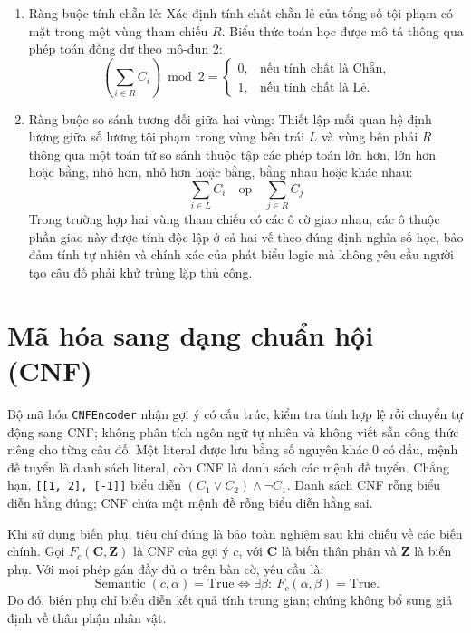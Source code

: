 \begin{enumerate}
    \item Ràng buộc tính chẵn lẻ: Xác định tính chất chẵn lẻ của tổng số tội phạm có mặt trong một vùng tham chiếu $R$. Biểu thức toán học được mô tả thông qua phép toán đồng dư theo mô-đun 2:
    \[
    \left(\sum_{i \in R} C_i\right) \bmod 2 = 
    \begin{cases}
    0, & \text{nếu tính chất là Chẵn}, \\
    1, & \text{nếu tính chất là Lẻ}.
    \end{cases}
    \]
    \item Ràng buộc so sánh tương đối giữa hai vùng: Thiết lập mối quan hệ định lượng giữa số lượng tội phạm trong vùng bên trái $L$ và vùng bên phải $R$ thông qua một toán tử so sánh thuộc tập các phép toán lớn hơn, lớn hơn hoặc bằng, nhỏ hơn, nhỏ hơn hoặc bằng, bằng nhau hoặc khác nhau:
    \[
    \sum_{i \in L} C_i \quad \text{op} \quad \sum_{j \in R} C_j
    \]
    Trong trường hợp hai vùng tham chiếu có các ô cờ giao nhau, các ô thuộc phần giao này được tính độc lập ở cả hai vế theo đúng định nghĩa số học, bảo đảm tính tự nhiên và chính xác của phát biểu logic mà không yêu cầu người tạo câu đố phải khử trùng lặp thủ công.
\end{enumerate}

\section{Mã hóa sang dạng chuẩn hội (CNF)}
\label{sec:ma-hoa-cnf}

Bộ mã hóa \texttt{CNFEncoder} nhận gợi ý có cấu trúc, kiểm tra tính hợp lệ rồi chuyển tự động sang CNF; không phân tích ngôn ngữ tự nhiên và không viết sẵn công thức riêng cho từng câu đố. Một literal được lưu bằng số nguyên khác 0 có dấu, mệnh đề tuyển là danh sách literal, còn CNF là danh sách các mệnh đề tuyển. Chẳng hạn, \texttt{[[1, 2], [-1]]} biểu diễn $(C_1\lor C_2)\land\neg C_1$. Danh sách CNF rỗng biểu diễn hằng đúng; CNF chứa một mệnh đề rỗng biểu diễn hằng sai.

Khi sử dụng biến phụ, tiêu chí đúng là bảo toàn nghiệm sau khi chiếu về các biến chính. Gọi $F_c(\mathbf C,\mathbf Z)$ là CNF của gợi ý $c$, với $\mathbf C$ là biến thân phận và $\mathbf Z$ là biến phụ. Với mọi phép gán đầy đủ $\alpha$ trên bàn cờ, yêu cầu là:
\[
\operatorname{Semantic}(c,\alpha)=\text{True}
\iff \exists\beta:\ F_c(\alpha,\beta)=\text{True}.
\]
Do đó, biến phụ chỉ biểu diễn kết quả tính trung gian; chúng không bổ sung giả định về thân phận nhân vật.

